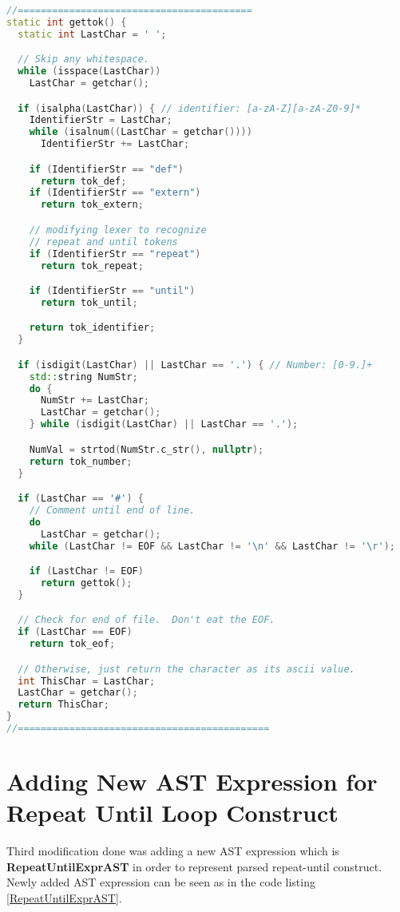 \documentclass[16pt]{article}
\begin{document}
\vspace{2.5pt}
\begin{lstlisting}[caption= Recognizing new tokens repeat and until,label=lexer-modification,
style=chstyle,language=C++]
//=========================================
static int gettok() {
  static int LastChar = ' ';

  // Skip any whitespace.
  while (isspace(LastChar))
    LastChar = getchar();

  if (isalpha(LastChar)) { // identifier: [a-zA-Z][a-zA-Z0-9]*
    IdentifierStr = LastChar;
    while (isalnum((LastChar = getchar())))
      IdentifierStr += LastChar;

    if (IdentifierStr == "def")
      return tok_def;
    if (IdentifierStr == "extern")
      return tok_extern;

    // modifying lexer to recognize 
    // repeat and until tokens
    if (IdentifierStr == "repeat")
      return tok_repeat; 

    if (IdentifierStr == "until")
      return tok_until;

    return tok_identifier;
  }

  if (isdigit(LastChar) || LastChar == '.') { // Number: [0-9.]+
    std::string NumStr;
    do {
      NumStr += LastChar;
      LastChar = getchar();
    } while (isdigit(LastChar) || LastChar == '.');

    NumVal = strtod(NumStr.c_str(), nullptr);
    return tok_number;
  }

  if (LastChar == '#') {
    // Comment until end of line.
    do
      LastChar = getchar();
    while (LastChar != EOF && LastChar != '\n' && LastChar != '\r');

    if (LastChar != EOF)
      return gettok();
  }

  // Check for end of file.  Don't eat the EOF.
  if (LastChar == EOF)
    return tok_eof;

  // Otherwise, just return the character as its ascii value.
  int ThisChar = LastChar;
  LastChar = getchar();
  return ThisChar;
}
//============================================
\end{lstlisting}

   
\section{Adding New AST Expression for Repeat Until Loop Construct}
Third modification done was adding a new AST expression which is  \textbf{RepeatUntilExprAST} in order to represent parsed repeat-until construct. Newly added AST expression can be seen as in the code listing \ref{RepeatUntilExprAST}.
\end{document}
